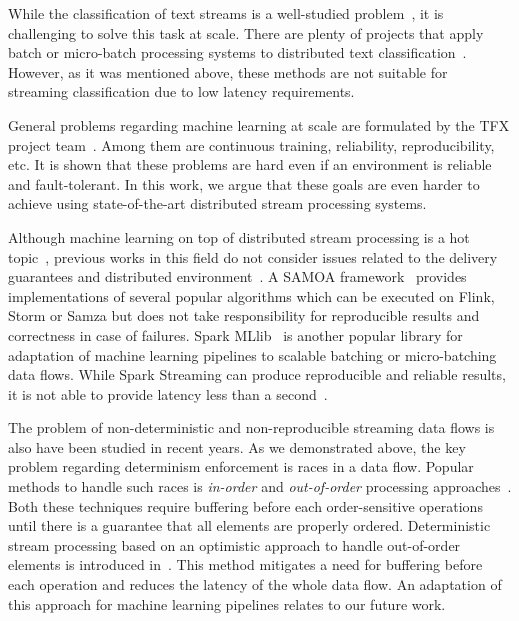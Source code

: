 \label{fs-related}

While the classification of text streams is a well-studied problem~\cite{zhang2008one, tampakas2005}, it is challenging to solve this task at scale. There are plenty of projects that apply batch or micro-batch processing systems to distributed text classification~\cite{semberecki2016distributed, 8029336, baltas2016apache, svyatkovskiy2016large}. However, as it was mentioned above, these methods are not suitable for streaming classification due to low latency requirements. 

General problems regarding machine learning at scale are formulated by the TFX project team~\cite{Baylor:2017:TTP:3097983.3098021}. Among them are continuous training, reliability, reproducibility, etc. It is shown that these problems are hard even if an environment is reliable and fault-tolerant. In this work, we argue that these goals are even harder to achieve using state-of-the-art distributed stream processing systems.

Although machine learning on top of distributed stream processing is a hot topic~\cite{qiu2016survey}, previous works in this field do not consider issues related to the delivery guarantees and distributed environment~\cite{khumoyun2016real}. A SAMOA framework~\cite{morales2015samoa} provides implementations of several popular algorithms which can be executed on Flink, Storm or Samza but does not take responsibility for reproducible results and correctness in case of failures. Spark MLlib~\cite{meng2016mllib} is another popular library for adaptation of machine learning pipelines to scalable batching or micro-batching data flows. While Spark Streaming can produce reproducible and reliable results, it is not able to provide latency less than a second~\cite{karimov2018benchmarking, S7530084}.

The problem of non-deterministic and non-reproducible streaming data flows is also have been studied in recent years.  As we demonstrated above, the key problem regarding determinism enforcement is races in a data flow. Popular methods to handle such races is {\em in-order} and {\em out-of-order} processing approaches~\cite{Li:2008:OPN:1453856.1453890}. Both these techniques require buffering before each order-sensitive operations until there is a guarantee that all elements are properly ordered. Deterministic stream processing based on an optimistic approach to handle out-of-order elements is introduced in~\cite{we2018adbis}. This method mitigates a need for buffering before each operation and reduces the latency of the whole data flow. An adaptation of this approach for machine learning pipelines relates to our future work.

